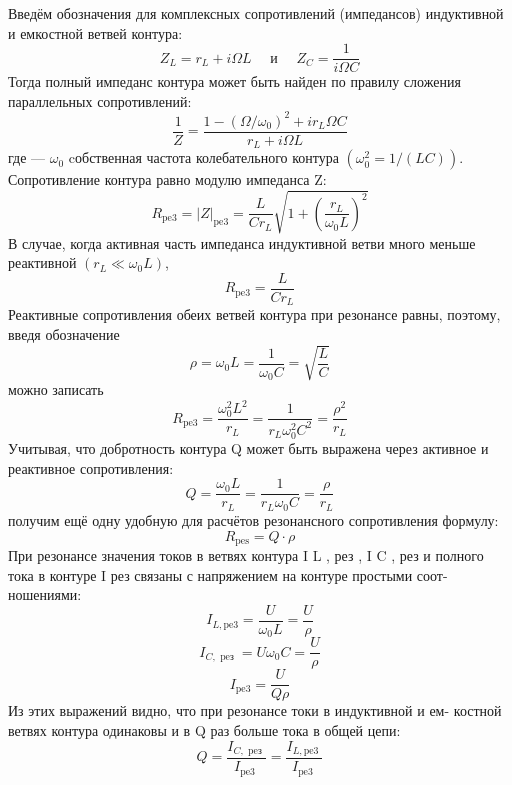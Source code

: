 \documentclass[a4paper, 12pt]{article}
\begin{document}
Введём обозначения для комплексных сопротивлений (импедансов)
индуктивной и емкостной ветвей контура:
$$Z_{L}=r_{L}+i \Omega L \quad \text { и } \quad Z_{C}=\frac{1}{i \Omega C}$$
Тогда полный импеданс контура может быть найден по правилу сложения параллельных сопротивлений:
\newpage
$$\frac{1}{Z}=\frac{1-\left(\Omega / \omega_{0}\right)^{2}+i r_{L} \Omega C}{r_{L}+i \Omega L}$$
где  — $\omega_{0}$ cобственная частота колебательного контура $\left(\omega_{0}^{2}=1 /(L C)\right)$.
Сопротивление контура равно модулю импеданса Z:
$$R_{\mathrm{pe3}}=|Z|_{\mathrm{pe3}}=\frac{L}{C r_{L}} \sqrt{1+\left(\frac{r_{L}}{\omega_{0} L}\right)^{2}}$$
В случае, когда активная часть импеданса индуктивной ветви много
меньше реактивной $\left(r_{L} \ll \omega_{0} L\right)$,
$$R_{\mathrm{pe} 3}=\frac{L}{C r_{L}}$$
Реактивные сопротивления обеих ветвей контура при резонансе равны,
поэтому, введя обозначение
\begin{equation}
\rho=\omega_{0} L=\frac{1}{\omega_{0} C}=\sqrt{\frac{L}{C}}
\end{equation}
можно записать
\begin{equation}R_{\mathrm{pe} 3}=\frac{\omega_{0}^{2} L^{2}}{r_{L}}=\frac{1}{r_{L} \omega_{0}^{2} C^{2}}=\frac{\rho^{2}}{r_{L}}\end{equation}
Учитывая, что добротность контура Q может быть выражена через
активное и реактивное сопротивления:
\begin{equation}Q=\frac{\omega_{0} L}{r_{L}}=\frac{1}{r_{L} \omega_{0} C}=\frac{\rho}{r_{L}}\end{equation}
получим ещё одну удобную для расчётов резонансного сопротивления
формулу:
\begin{equation}R_{\mathrm{pes}}=Q \cdot \rho\end{equation}
При резонансе значения токов в ветвях контура I L , рез , I C , рез и полного
тока в контуре I рез связаны с напряжением на контуре простыми соот-
ношениями:
\begin{equation}I_{L, \mathrm{pe} 3}=\frac{U}{\omega_{0} L}=\frac{U}{\rho}\end{equation}
\begin{equation}I_{C, \text { peз }}=U \omega_{0} C=\frac{U}{\rho}\end{equation}
\begin{equation}I_{\mathrm{pe3}}=\frac{U}{Q \rho}\end{equation}
Из этих выражений видно, что при резонансе токи в индуктивной и ем-
костной ветвях контура одинаковы и в Q раз больше тока в общей цепи:
\begin{equation}Q=\frac{I_{C, \text { peз }}}{I_{\text {pe3 }}}=\frac{I_{L, \text {pe3 }}}{I_{\text {pe3 }}}\end{equation}
\end{document}
